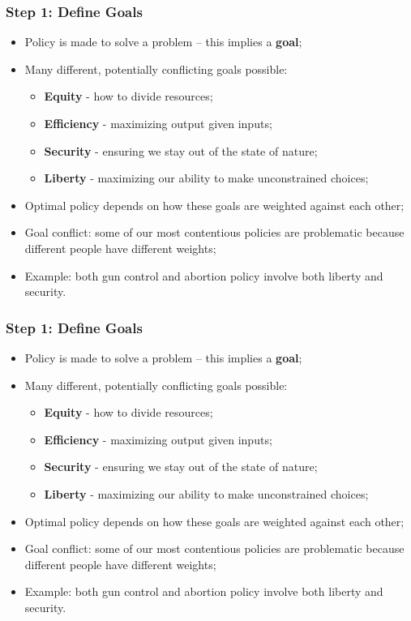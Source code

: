 \documentclass[aspectratio=169]{beamer}
\theoremstyle{principle}
\begin{document}
\begin{frame}
\frametitle{Step 1: Define Goals}
\begin{itemize}
\item Policy is made to solve a problem -- this implies a \textbf{goal};
\bigskip
\item Many different, potentially conflicting goals possible:
\begin{itemize}
\item \textbf{Equity}\color{white} - how to divide resources;\color{black}
\item \textbf{Efficiency}\color{white} - maximizing output given inputs;\color{black}
\item \textbf{Security}\color{white} - ensuring we stay out of the state of nature;\color{black}
\item \textbf{Liberty}\color{white} - maximizing our ability to make unconstrained choices;\color{black}
\end{itemize}
\bigskip
\item Optimal policy depends on how these goals are weighted against each other;
\bigskip
\item Goal conflict: some of our most contentious policies are problematic because different people have different weights;
\bigskip
\item Example: \color{white}both gun control and abortion policy involve both liberty and security.
\end{itemize}
\end{frame}

\begin{frame}
\frametitle{Step 1: Define Goals}
\begin{itemize}
\item Policy is made to solve a problem -- this implies a \textbf{goal};
\bigskip
\item Many different, potentially conflicting goals possible:
\begin{itemize}
\item \textbf{Equity} - how to divide resources;
\item \textbf{Efficiency} - maximizing output given inputs;
\item \textbf{Security} - ensuring we stay out of the state of nature;
\item \textbf{Liberty} - maximizing our ability to make unconstrained choices;
\end{itemize}
\bigskip
\item Optimal policy depends on how these goals are weighted against each other;
\bigskip
\item Goal conflict: some of our most contentious policies are problematic because different people have different weights;
\bigskip
\item Example: \color{white}both gun control and abortion policy involve both liberty and security.
\end{itemize}
\end{frame}
\end{document}
